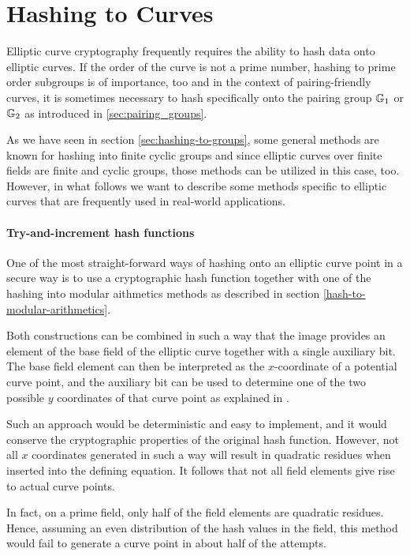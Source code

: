 
\section{Hashing to Curves} Elliptic curve cryptography frequently requires the ability to hash data onto elliptic curves. If the order of the curve is not a prime number, hashing to prime order subgroups is of importance, too and in the context of pairing-friendly curves, it is sometimes necessary to hash specifically onto the pairing group $\mathbb{G}_1$ or $\mathbb{G}_2$ as introduced in \ref{sec:pairing_groups}.

As we have seen in section \ref{sec:hashing-to-groups}, some general methods are known for hashing into finite cyclic groups and since elliptic curves over finite fields are finite and cyclic groups, those methods can be utilized in this case, too. However, in what follows we want to describe some methods specific to elliptic curves that are frequently used in real-world applications. 

\paragraph{Try-and-increment hash functions}
One of the most straight-forward ways of hashing onto an elliptic curve point in a secure way is to use a cryptographic hash function together with one of the hashing into modular aithmetics methods as described in section \ref{hash-to-modular-arithmetics}.

Both constructions can be combined in such a way that the image provides an element of the base field of the elliptic curve together with a single auxiliary bit. The base field element can then be interpreted as the $x$-coordinate of a potential curve point, and the auxiliary bit can be used to determine one of the two possible $y$ coordinates of that curve point as explained in \label{sec:affine_point_compression}.

Such an approach would be deterministic and easy to implement, and it would conserve the cryptographic properties of the original hash function. However, not all $x$ coordinates generated in such a way will result in quadratic residues when inserted into the defining equation. It follows that not all field elements give rise to actual curve points. 

In fact,
on a prime field, only half of the field elements are quadratic residues. Hence, assuming an even distribution of the hash values in the field, this method would fail to generate a curve point in about half of the attempts. 

